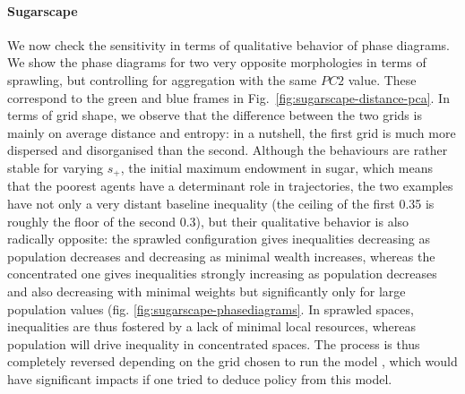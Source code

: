 \documentclass[preprint,5p,times,twocolumn,authoryear]{elsarticle}
\begin{document}
\paragraph{Sugarscape}

We now check the sensitivity in terms of qualitative behavior of phase diagrams. We show the phase diagrams for two very opposite morphologies in terms of sprawling, but controlling for aggregation with the same $PC2$ value. These correspond to the green and blue frames in Fig.~\ref{fig:sugarscape-distance-pca}. In terms of grid shape, we observe that the difference between the two grids is mainly on average distance and entropy: in a nutshell, the first grid is much more dispersed and disorganised than the second. Although the behaviours are rather stable for varying $s_+$, the initial maximum endowment in sugar, which means that the poorest agents have a determinant role in trajectories, the two examples have not only a very distant baseline inequality (the ceiling of the first 0.35 is roughly the floor of the second 0.3), but their qualitative behavior is also radically opposite: the sprawled configuration gives inequalities decreasing as population decreases and decreasing as minimal wealth increases, whereas the concentrated one gives inequalities strongly increasing as population decreases and also decreasing with minimal weights but significantly only for large population values (fig. \ref{fig:sugarscape-phasediagrams}. In sprawled spaces, inequalities are thus fostered by a lack of minimal local resources, whereas population will drive inequality in concentrated spaces. The process is thus completely reversed depending on the grid chosen to run the model , which would have significant impacts if one tried to deduce policy from this model.


\end{document}
